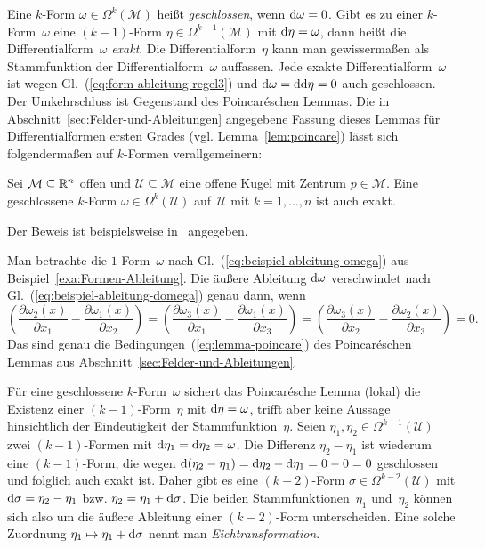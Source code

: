 Eine $k$-Form $\omega\in\Omega^{k}(\mathcal{M})$ heißt \emph{geschlossen},
wenn ${\mathrm{d}}\omega=0$. Gibt es zu einer $k$-Form~$\omega$ eine $(k-1)$-Form
$\eta\in\Omega^{k-1}(\mathcal{M})$ mit ${\mathrm{d}}\eta=\omega$, dann heißt
die Differentialform~$\omega$ \emph{exakt}.
Die Differentialform~$\eta$ kann man gewissermaßen als Stammfunktion
der Differentialform~$\omega$ auffassen. Jede exakte Differentialform~$\omega$
ist wegen Gl.~(\ref{eq:form-ableitung-regel3}) und ${\mathrm{d}}\omega={\mathrm{d}}{\mathrm{d}}\eta=0$
auch geschlossen. Der Umkehrschluss ist Gegenstand des Poincaréschen
Lemmas. Die in Abschnitt~\ref{sec:Felder-und-Ableitungen} angegebene
Fassung dieses Lemmas für Differentialformen ersten Grades (vgl. Lemma~\ref{lem:poincare})
lässt sich folgendermaßen auf $k$-Formen verallgemeinern:
\begin{lemma}
\label{lem:poincare-formen}Sei
$\mathcal{M}\subseteq{\mathbb{R}}^{n}$ offen und $\mathcal{U}\subseteq\mathcal{M}$
eine offene Kugel mit Zentrum $p\in\mathcal{M}$. Eine geschlossene
$k$-Form $\omega\in\Omega^{k}(\mathcal{U})$ auf~$\mathcal{U}$
mit $k=1,\ldots,n$ ist auch exakt.
\end{lemma}
Der Beweis ist beispielsweise in~\cite{agricola2001,kerner2007}
angegeben.
\begin{example}
Man betrachte die $1$-Form~$\omega$ nach Gl.~(\ref{eq:beispiel-ableitung-omega})
aus Beispiel~\ref{exa:Formen-Ableitung}. Die äußere Ableitung ${\mathrm{d}}\omega$
verschwindet nach Gl.~(\ref{eq:beispiel-ableitung-domega}) genau
dann, wenn 
\[
\left(\frac{\partial\omega_{2}(x)}{\partial x_{1}}-\frac{\partial\omega_{1}(x)}{\partial x_{2}}\right)=\left(\frac{\partial\omega_{3}(x)}{\partial x_{1}}-\frac{\partial\omega_{1}(x)}{\partial x_{3}}\right)=\left(\frac{\partial\omega_{3}(x)}{\partial x_{2}}-\frac{\partial\omega_{2}(x)}{\partial x_{3}}\right)=0.
\]
Das sind genau die Bedingungen~(\ref{eq:lemma-poincare}) des Poincaréschen
Lemmas aus Abschnitt~\ref{sec:Felder-und-Ableitungen}.

Für eine geschlossene $k$-Form~$\omega$ sichert das Poincarésche
Lemma (lokal) die Existenz einer $(k-1)$-Form~$\eta$ mit ${\mathrm{d}}\eta=\omega$,
trifft aber keine Aussage hinsichtlich der Eindeutigkeit der Stammfunktion~$\eta$.
Seien $\eta_{1},\eta_{2}\in\Omega^{k-1}(\mathcal{U})$ zwei $(k-1)$-Formen
mit ${\mathrm{d}}\eta_{1}={\mathrm{d}}\eta_{2}=\omega$. Die Differenz $\eta_{2}-\eta_{1}$
ist wiederum eine $(k-1)$-Form, die wegen ${\mathrm{d}}(\eta_{2}-\eta_{1})={\mathrm{d}}\eta_{2}-{\mathrm{d}}\eta_{1}=0-0=0$
geschlossen und folglich auch exakt ist. Daher gibt es eine $(k-2)$-Form
$\sigma\in\Omega^{k-2}(\mathcal{U})$ mit ${\mathrm{d}}\sigma=\eta_{2}-\eta_{1}$
bzw. $\eta_{2}=\eta_{1}+{\mathrm{d}}\sigma$. Die beiden Stammfunktionen~$\eta_{1}$
und~$\eta_{2}$ können sich also um die äußere Ableitung einer $(k-2)$-Form
unterscheiden. Eine solche Zuordnung $\eta_{1}\mapsto\eta_{1}+{\mathrm{d}}\sigma$
nennt man \emph{Eichtransformation}.

\medskip{}
\end{example}

